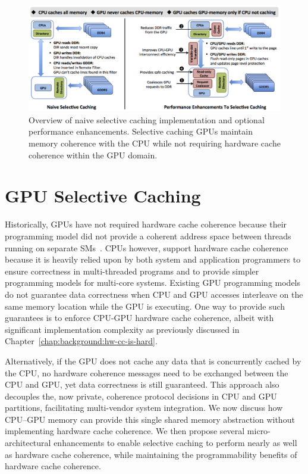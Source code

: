 \begin{figure}[tp]
\centering
\includegraphics[width=1.0\textwidth]{hpca2016/figures/coherence_overview.png}
\caption{Overview of naive selective caching implementation and optional performance enhancements.
Selective caching GPUs maintain memory coherence with the CPU while not
requiring hardware cache coherence within the GPU domain.}
\label{fig:coherence_overview}
\vspace{.05in}
\end{figure}

\section{GPU Selective Caching}
\label{proposal}

Historically, GPUs have not required hardware cache coherence because their
programming model did not provide a coherent address space between threads running on separate
SMs~\cite{CUDA7}.  CPUs however, support hardware cache coherence 
because it is heavily relied upon by both system and application
programmers to ensure correctness in multi-threaded programs and to provide
simpler programming models for multi-core systems.
Existing GPU programming models do not guarantee data correctness when CPU and GPU accesses
interleave on the same memory location while the GPU is executing. One way to
provide such guarantees is to enforce CPU-GPU hardware cache coherence, albeit with significant implementation 
complexity as previously discussed in Chapter~\ref{chap:background:hw-cc-is-hard}.

Alternatively, if the GPU does not cache any data that is concurrently cached by the CPU,
no hardware coherence messages need to be exchanged between the CPU and GPU, yet data correctness is still guaranteed. 
This approach also decouples
the, now private, coherence protocol decisions in CPU and GPU partitions, facilitating multi-vendor 
system integration.  We now discuss how CPU--GPU
memory can provide this single shared memory abstraction without implementing 
hardware cache coherence. We then propose several micro-architectural enhancements to enable selective caching
to perform nearly as well as hardware cache coherence, while maintaining the programmability benefits of hardware cache coherence.

